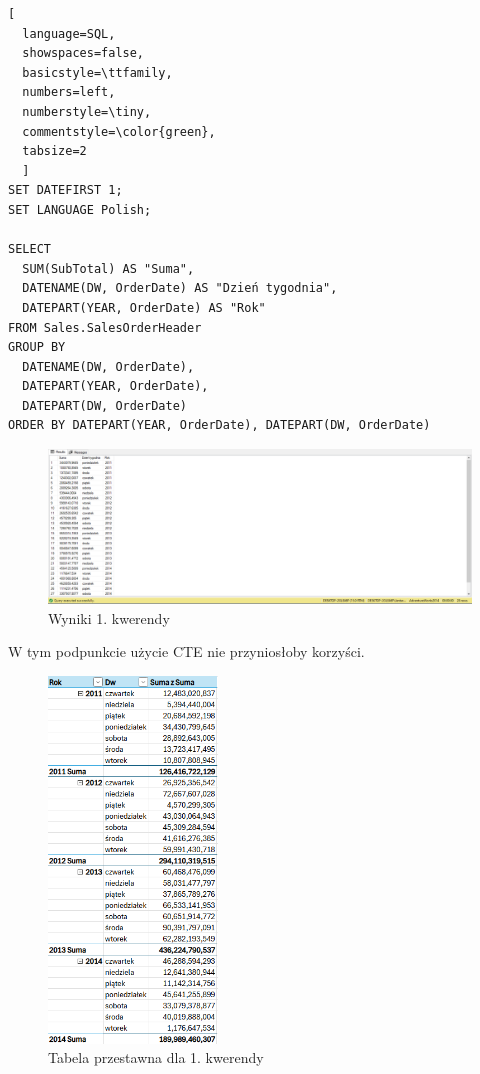 \documentclass[a4paper,12pt]{article}
\begin{document}
\begin{lstlisting}[
  language=SQL,
  showspaces=false,
  basicstyle=\ttfamily,
  numbers=left,
  numberstyle=\tiny,
  commentstyle=\color{green},
  tabsize=2
  ]
SET DATEFIRST 1;
SET LANGUAGE Polish;

SELECT 
  SUM(SubTotal) AS "Suma",
  DATENAME(DW, OrderDate) AS "Dzień tygodnia",
  DATEPART(YEAR, OrderDate) AS "Rok"
FROM Sales.SalesOrderHeader
GROUP BY 
  DATENAME(DW, OrderDate), 
  DATEPART(YEAR, OrderDate), 
  DATEPART(DW, OrderDate)
ORDER BY DATEPART(YEAR, OrderDate), DATEPART(DW, OrderDate)
\end{lstlisting}

\begin{figure}[H]
	\centering
	\includegraphics[width=1.0\textwidth]{images/1.png}
	\caption{Wyniki 1. kwerendy}
\end{figure}

W tym podpunkcie użycie CTE nie przyniosłoby korzyści.

\begin{figure}[H]
	\centering
	\includegraphics[width=0.4\textwidth]{images/1_excel.png}
	\caption{Tabela przestawna dla 1. kwerendy}
\end{figure}
\end{document}
